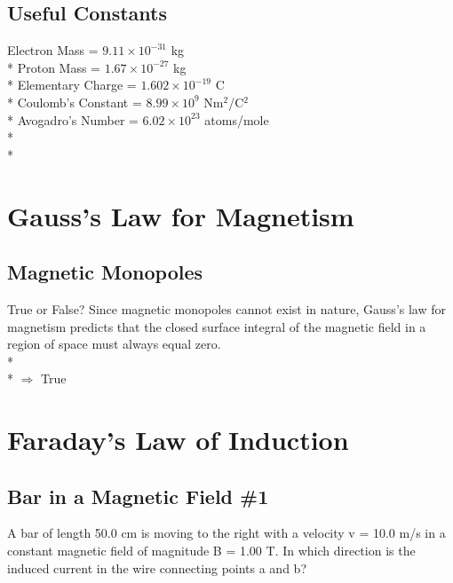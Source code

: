 \documentclass[11pt]{article}
\begin{document}
\maketitle
\tableofcontents
\vspace{50pt}

\subsection*{Useful Constants}
Electron Mass = $9.11 \times 10^{-31}$ kg \\*
Proton Mass = $1.67 \times 10^{-27}$ kg \\*
Elementary Charge = $1.602 \times 10^{-19}$ C \\*
Coulomb's Constant = $8.99 \times 10^9$ Nm$^2$/C$^2$ \\*
Avogadro's Number = $ 6.02 \times 10^{23}$ atoms/mole \\*\\*


\pagebreak
\section{Gauss's Law for Magnetism}
\vspace{10pt}

\subsection{Magnetic Monopoles}
True or False?  Since magnetic monopoles cannot exist in nature, Gauss's law for magnetism predicts that the closed surface integral of the magnetic field in a region of space must always equal zero.\\* \\*
$\Rightarrow$ True



\pagebreak
\section{Faraday's Law of Induction}
\vspace{10pt}

\subsection{Bar in a Magnetic Field \#1}
A bar of length 50.0 cm is moving to the right with a velocity v = 10.0 m/s in a constant magnetic field of magnitude B = 1.00 T.  In which direction is the induced current in the wire connecting points a and b?
\end{document}
